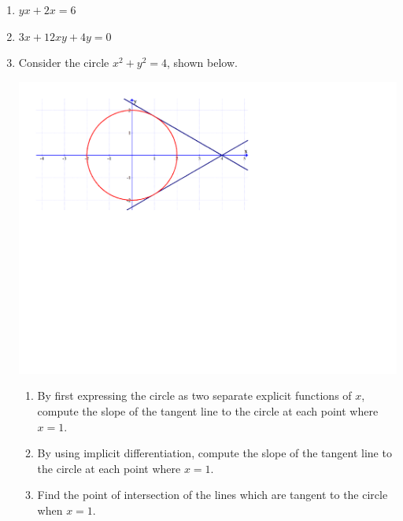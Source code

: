 \documentclass[12pt]{article}
\newif\ifans
\begin{document}
\begin{enumerate}

\item $yx+2x=6$ 

\ifans{\fbox{$y=\frac{6-2x}{x}$ for $x\neq 0$; $\frac{dy}{dx}=-6x^{-2}$}} \fi

\item $3x+12xy+4y=0$ 

\ifans{\fbox{$y=-\frac{3x}{12x+4}$ for $x\neq-\frac{1}{3}$; $\frac{dy}{dx}=\frac{-3}{4(3x+1)^2}$}} \fi

\item Consider the circle $x^2+y^2=4$, shown below.

\begin{center}
\includegraphics[scale=0.5]{circle.pdf}
\end{center}

\begin{enumerate}

\item By first expressing the circle as two separate explicit functions of $x$, compute the slope of the tangent line to the circle at each point where $x=1$.

\ifans{\fbox{$\left.\frac{dy}{dx}\right|_{(x,y)=\left(1,\sqrt{3}\right)}=-\frac{1}{\sqrt{3}}$ and $\left.\frac{dy}{dx}\right|_{(x,y)=\left(1,-\sqrt{3}\right)}=\frac{1}{\sqrt{3}}$}} \fi

\item By using implicit differentiation, compute the slope of the tangent line to the circle at each point where $x=1$.

\ifans{\fbox{$\left.\frac{dy}{dx}\right|_{(x,y)=\left(1,\sqrt{3}\right)}=-\frac{1}{\sqrt{3}}$ and $\left.\frac{dy}{dx}\right|_{(x,y)=\left(1,-\sqrt{3}\right)}=\frac{1}{\sqrt{3}}$}} \fi

\item Find the point of intersection of the lines which are tangent to the circle when $x=1$.

\ifans{\fbox{$(4,0)$; Video Solution: \href{http://www.youtube.com/watch?v=I_07fHrtkMw}{http://www.youtube.com/watch?v=I\_07fHrtkMw}}} \fi

\end{enumerate}

\end{enumerate}
\end{document}
